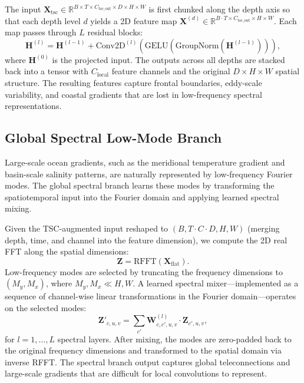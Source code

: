 \documentclass[conference]{IEEEtran}
\begin{document}
The input $\mathbf{X}_{\text{tsc}} \in \mathbb{R}^{B \times T \times C_{\text{tsc\_out}} \times D \times H \times W}$ is first chunked along the depth axis so that each depth level $d$ yields a 2D feature map $\mathbf{X}^{(d)} \in \mathbb{R}^{B \cdot T \times C_{\text{tsc\_out}} \times H \times W}$. Each map passes through $L$ residual blocks:
\begin{equation}
\mathbf{H}^{(l)} = \mathbf{H}^{(l-1)} + \text{Conv2D}^{(l)}(\text{GELU}(\text{GroupNorm}(\mathbf{H}^{(l-1)}))),
\end{equation}
where $\mathbf{H}^{(0)}$ is the projected input. The outputs across all depths are stacked back into a tensor with $C_{\text{local}}$ feature channels and the original $D \times H \times W$ spatial structure. The resulting features capture frontal boundaries, eddy-scale variability, and coastal gradients that are lost in low-frequency spectral representations.

\subsection{Global Spectral Low-Mode Branch}

Large-scale ocean gradients, such as the meridional temperature gradient and basin-scale salinity patterns, are naturally represented by low-frequency Fourier modes. The global spectral branch learns these modes by transforming the spatiotemporal input into the Fourier domain and applying learned spectral mixing.

Given the TSC-augmented input reshaped to $(B, T \cdot C \cdot D, H, W)$ (merging depth, time, and channel into the feature dimension), we compute the 2D real FFT along the spatial dimensions:
\begin{equation}
\mathbf{Z} = \text{RFFT}(\mathbf{X}_{\text{flat}}).
\end{equation}
Low-frequency modes are selected by truncating the frequency dimensions to $(M_y, M_x)$, where $M_y, M_x \ll H, W$. A learned spectral mixer---implemented as a sequence of channel-wise linear transformations in the Fourier domain---operates on the selected modes:
\begin{equation}
\mathbf{Z}'_{c,u,v} = \sum_{c'} \mathbf{W}^{(l)}_{c,c',u,v} \cdot \mathbf{Z}_{c',u,v},
\end{equation}
for $l = 1,\ldots,L$ spectral layers. After mixing, the modes are zero-padded back to the original frequency dimensions and transformed to the spatial domain via inverse RFFT. The spectral branch output captures global teleconnections and large-scale gradients that are difficult for local convolutions to represent.
\end{document}
